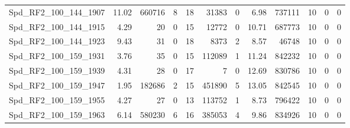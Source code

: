 \begin{longtable}[c]{@{}lrrrrrrrrrrr@{}}
Spd\_RF2\_100\_144\_1907      & 11.02                  & 660716                  & 8                       & 18                     & 31383                   & 0                       & 6.98                    & 737111                   & 10                       & 0                        & 0                        \\
Spd\_RF2\_100\_144\_1915      & 4.29                   & 20                      & 0                       & 15                     & 12772                   & 0                       & 10.71                   & 687773                   & 10                       & 0                        & 0                        \\
Spd\_RF2\_100\_144\_1923      & 9.43                   & 31                      & 0                       & 18                     & 8373                    & 2                       & 8.57                    & 46748                    & 10                       & 0                        & 0                        \\
Spd\_RF2\_100\_159\_1931      & 3.76                   & 35                      & 0                       & 15                     & 112089                  & 1                       & 11.24                   & 842232                   & 10                       & 0                        & 0                        \\
Spd\_RF2\_100\_159\_1939      & 4.31                   & 28                      & 0                       & 17                     & 7                       & 0                       & 12.69                   & 830786                   & 10                       & 0                        & 0                        \\
Spd\_RF2\_100\_159\_1947      & 1.95                   & 182686                  & 2                       & 15                     & 451890                  & 5                       & 13.05                   & 842545                   & 10                       & 0                        & 0                        \\
Spd\_RF2\_100\_159\_1955      & 4.27                   & 27                      & 0                       & 13                     & 113752                  & 1                       & 8.73                    & 796422                   & 10                       & 0                        & 0                        \\
Spd\_RF2\_100\_159\_1963      & 6.14                   & 580230                  & 6                       & 16                     & 385053                  & 4                       & 9.86                    & 834926                   & 10                       & 0                        & 0                        \\

\end{longtable}
